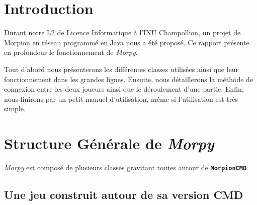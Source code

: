 \documentclass{report}
\begin{document}
\section*{Introduction}

Durant notre L2 de Licence Informatique à l'INU Champollion, un projet de Morpion en réseau programmé en Java nous a été proposé. Ce rapport présente en profondeur le fonctionnement de \emph{Morpy}.

Tout d'abord nous présenterons les différentes classes utilisées ainsi que leur fonctionnement dans les grandes lignes.
Ensuite, nous détaillerons la méthode de connexion entre les deux joueurs ainsi que le déroulement d'une partie.
Enfin, nous finirons par un petit manuel d'utilisation, même si l'utilisation est très simple.


\section*{Structure Générale de \emph{Morpy}}

\emph{Morpy} est composé de plusieurs classes gravitant toutes autour de \textbf{\texttt{MorpionCMD}}. 

\subsection*{Une jeu construit autour de sa version CMD}
\end{document}
